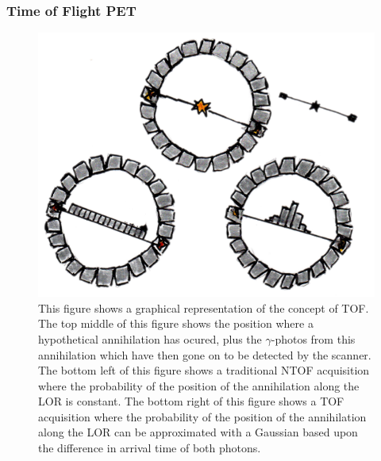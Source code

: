             \subsubsection{Time of Flight PET} \label{sec:time_of_flight_pet}
                \begin{figure}
                    \centering
                    
                    \includegraphics[width=1.0\linewidth]{figures/background_tof.png}
                    
                    \captionsetup{singlelinecheck=false, justification=raggedright}
                    \caption{This figure shows a graphical representation of the concept of \gls{TOF}. The top middle of this figure shows the position where a hypothetical annihilation has ocured, plus the $\gamma$-photos from this annihilation which have then gone on to be detected by the scanner. The bottom left of this figure shows a traditional \gls{NTOF} acquisition where the probability of the position of the annihilation along the \gls{LOR} is constant. The bottom right of this figure shows a \gls{TOF} acquisition where the probability of the position of the annihilation along the \gls{LOR} can be approximated with a Gaussian based upon the difference in arrival time of both photons.} \label{fig:time_of_flight_pet_tof}
                \end{figure}
                
